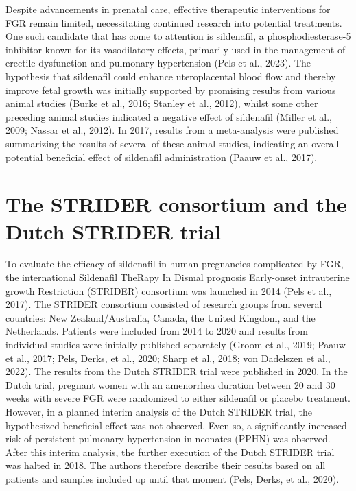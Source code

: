 \documentclass[authordate, reflection,issue]{jote-new-article}
\begin{document}
	Despite advancements in prenatal care, effective therapeutic interventions for FGR remain limited, necessitating continued research into potential treatments. One such candidate that has come to attention is sildenafil, a phosphodiesterase-5 inhibitor known for its vasodilatory effects, primarily used in the management of erectile dysfunction and pulmonary hypertension (Pels et al., 2023). The hypothesis that sildenafil could enhance uteroplacental blood flow and thereby improve fetal growth was initially supported by promising results from various animal studies (Burke et al., 2016; Stanley et al., 2012), whilst some other preceding animal studies indicated a negative effect of sildenafil (Miller et al., 2009; Nassar et al., 2012). In 2017, results from a meta-analysis were published summarizing the results of several of these animal studies, indicating an overall potential beneficial effect of sildenafil administration (Paauw et al., 2017).




	




	\section{The STRIDER consortium and the Dutch STRIDER trial}



	To evaluate the efficacy of sildenafil in human pregnancies complicated by FGR, the international Sildenafil TheRapy In Dismal prognosis Early-onset intrauterine growth Restriction (STRIDER) consortium was launched in 2014 (Pels et al., 2017). The STRIDER consortium consisted of research groups from several countries: New Zealand/Australia, Canada, the United Kingdom, and the Netherlands. Patients were included from 2014 to 2020 and results from individual studies were initially published separately (Groom et al., 2019; Paauw et al., 2017; Pels, Derks, et al., 2020; Sharp et al., 2018; von Dadelszen et al., 2022). The results from the Dutch STRIDER trial were published in 2020. In the Dutch trial, pregnant women with an amenorrhea duration between 20 and 30 weeks with severe FGR were randomized to either sildenafil or placebo treatment. However, in a planned interim analysis of the Dutch STRIDER trial, the hypothesized beneficial effect was not observed. Even so, a significantly increased risk of persistent pulmonary hypertension in neonates (PPHN) was observed. After this interim analysis, the further execution of the Dutch STRIDER trial was halted in 2018. The authors therefore describe their results based on all patients and samples included up until that moment (Pels, Derks, et al., 2020).
\end{document}
